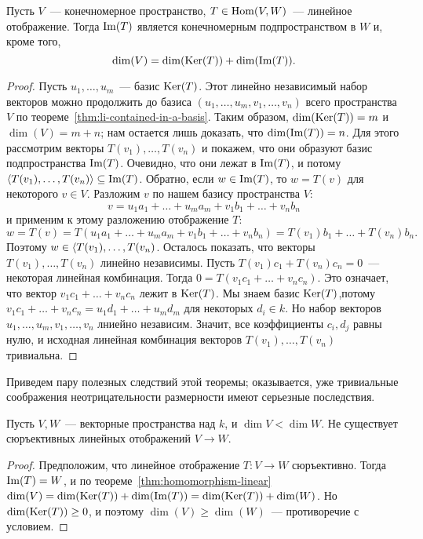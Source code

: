 \begin{theorem}[О гомоморфизме]\label{thm:homomorphism-linear}
Пусть $V$~--- конечномерное пространство, $T\in\operatorname{Hom}(V,W)$~---
линейное отображение. Тогда $\operatorname{Im}(T)$ является конечномерным
подпространством в $W$ и, кроме того,
$$
\dim(V) = \dim(\operatorname{Ker}(T)) + \dim(\operatorname{Im}(T)).
$$
\end{theorem}
\begin{proof}
Пусть $u_1,\dots,u_m$~--- базис $\operatorname{Ker}(T)$. Этот линейно
независимый набор векторов можно продолжить до базиса
$(u_1,\dots,u_m,v_1,\dots,v_n)$ всего пространства $V$
по теореме~\ref{thm:li-contained-in-a-basis}.
Таким образом, $\dim(\operatorname{Ker}(T)) = m$ и $\dim(V) = m+n$;
нам остается лишь доказать, что $\dim(\operatorname{Im}(T)) = n$.
Для этого рассмотрим векторы $T(v_1),\dots,T(v_n)$ и покажем,
что они образуют базис подпространства $\operatorname{Im}(T)$. Очевидно,
что они лежат в $\operatorname{Im}(T)$, и потому
$\langle T(v_1),\dots,T(v_n)\rangle\subseteq\operatorname{Im}(T)$. Обратно, если
$w\in\operatorname{Im}(T)$, то $w=T(v)$ для некоторого $v\in V$.
Разложим $v$ по нашем базису пространства $V$:
$$
v = u_1a_1+\dots+u_ma_m + v_1b_1+\dots+v_nb_n
$$
и применим к этому разложению отображение $T$:
$$
w = T(v) = T(u_1a_1+\dots+u_ma_m + v_1b_1 + \dots + v_nb_n)
= T(v_1)b_1 + \dots + T(v_n)b_n.
$$
Поэтому $w\in \langle T(v_1),\dots,T(v_n)$.
Осталось показать, что векторы $T(v_1),\dots,T(v_n)$
линейно независимы. Пусть
$T(v_1)c_1 + T(v_n)c_n = 0$~--- некоторая линейная комбинация.
Тогда $0=T(v_1c_1+\dots+v_nc_n)$. Это означает, что
вектор $v_1c_1+\dots+v_nc_n$ лежит в $\operatorname{Ker}(T)$.
Мы знаем базис $\operatorname{Ker}(T)$,потому
$v_1c_1+\dots+v_nc_n = u_1d_1 + \dots +u_md_m$ для некоторых
$d_i\in k$. Но набор векторов $u_1,\dots,u_m,v_1,\dots,v_n$
лниейно независим. Значит, все коэффициенты $c_i,d_j$ равны
нулю, и исходная линейная комбинация векторов
$T(v_1),\dots,T(v_n)$ тривиальна.
\end{proof}

Приведем пару полезных следствий этой теоремы; оказывается,
уже тривиальные соображения неотрицательности размерности
имеют серьезные последствия.

\begin{corollary}
Пусть $V,W$~--- векторные пространства над $k$, и
$\dim V < \dim W$. Не существует сюръективных линейных
отображений $V\to W$.
\end{corollary}
\begin{proof}
Предположим, что линейное отображение
$T\colon V\to W$ сюръективно. Тогда
$\operatorname{Im}(T) = W$, и по теореме~\ref{thm:homomorphism-linear}
$\dim(V) = \dim(\operatorname{Ker}(T)) + \dim(\operatorname{Im}(T))
= \dim(\operatorname{Ker}(T)) + \dim(W)$.
Но $\dim(\operatorname{Ker}(T))\geq 0$, и поэтому
$\dim(V) \geq \dim(W)$~--- противоречие с условием.
\end{proof}

